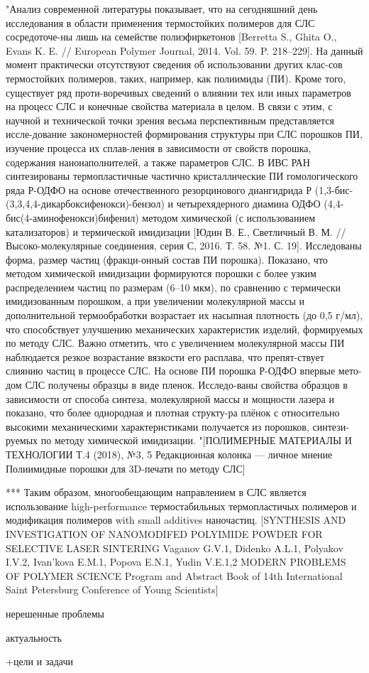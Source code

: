 	"Анализ современной литературы показывает, что на сегодняшний день исследования в области применения термостойких полимеров для СЛС сосредоточе-ны лишь на семействе полиэфиркетонов [Berretta S., Ghita O., Evans K. E. // European Polymer Journal, 2014. Vol. 59. P. 218–229]. На данный момент практически отсутствуют сведения об использовании других клас-сов термостойких полимеров, таких, например, как полиимиды (ПИ). Кроме того, существует ряд проти-воречивых сведений о влиянии тех или иных параметров на процесс СЛС и конечные свойства материала в целом. В связи с этим, с научной и технической точки зрения весьма перспективным представляется иссле-дование закономерностей формирования структуры при СЛС порошков ПИ, изучение процесса их сплав-ления в зависимости от свойств порошка, содержания нанонаполнителей, а также параметров СЛС.
	В ИВС РАН синтезированы термопластичные частично кристаллические ПИ гомологического ряда Р-ОДФО на основе отечественного резорцинового диангидрида Р (1,3-бис-(3,3,4,4-дикарбоксифенокси)-бензол) и четырехядерного диамина ОДФО (4,4-бис(4-аминофенокси)бифенил) методом химической (с использованием катализаторов) и термической имидизации [Юдин В. Е., Светличный В. М. // Высоко-молекулярные соединения, серия С, 2016. Т. 58. №1. С. 19]. Исследованы форма, размер частиц (фракци-онный состав ПИ порошка). Показано, что методом химической имидизации формируются порошки с более узким распределением частиц по размерам (6–10 мкм), по сравнению с термически имидизованным порошком, а при увеличении молекулярной массы и дополнительной термообработки возрастает их насыпная плотность (до 0,5 г/мл), что способствует улучшению механических характеристик изделий, формируемых по методу СЛС. Важно отметить, что с увеличением молекулярной массы ПИ наблюдается резкое возрастание вязкости его расплава, что препят-ствует слиянию частиц в процессе СЛС.
На основе ПИ порошка Р-ОДФО впервые мето-дом СЛС получены образцы в виде пленок. Исследо-ваны свойства образцов в зависимости от способа синтеза, молекулярной массы и мощности лазера и показано, что более однородная и плотная структу-ра плёнок с относительно высокими механическими характеристиками получается из порошков, синтези-руемых по методу химической имидизации.
	"[ПОЛИМЕРНЫЕ МАТЕРИАЛЫ И ТЕХНОЛОГИИ Т.4 (2018), №3, 5
Редакционная колонка — личное мнение
Полиимидные порошки для 3D-печати по методу СЛС]
	
	
	***
	Таким образом, многообещающим направлением в СЛС является использование high-performance термостабильных термопластичых полимеров и модификация полимеров with small additives наночастиц.
[SYNTHESIS AND INVESTIGATION OF NANOMODIFED POLYIMIDE POWDER FOR
SELECTIVE LASER SINTERING
Vaganov G.V.1, Didenko A.L.1, Polyakov I.V.2, Ivan’kova E.M.1, Popova E.N.1, Yudin V.E.1,2 MODERN PROBLEMS
OF POLYMER SCIENCE
Program and Abstract Book
of 14th International Saint Petersburg Conference
of Young Scientists]	


нерешенные проблемы

актуальность

+цели и задачи
